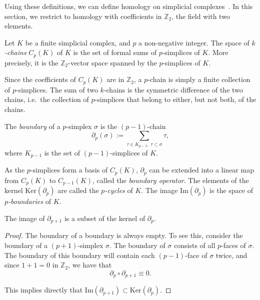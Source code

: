 \documentclass[a4paper,11pt,openany,extrafontsizes]{memoir}
\begin{document}
Using these definitions, we can define homology on simplicial
complexes~\cite{edelsbrunner_computational_2010,
  chazal_introduction_2017}. In this section, we restrict to homology
with coefficients in $\mathbb{Z}_2$, the field with two elements.

\begin{defn}[$k$-chains]
  Let $K$ be a finite simplicial complex, and $p$ a non-negative
  integer. The space of \emph{$k$-chains} $C_p(K)$ of $K$ is the set
  of formal sums of $p$-simplices of $K$. More precisely, it is the
  $\mathbb{Z}_2$-vector space spanned by the $p$-simplices of $K$.
\end{defn}

Since the coefficients of $C_p(K)$ are in $\mathbb{Z}_2$, a $p$-chain
is simply a finite collection of $p$-simplices. The sum of two
$k$-chains is the symmetric difference of the two chains, i.e.\ the
collection of $p$-simplices that belong to either, but not both, of
the chains.

\begin{defn}[Boundary]
  The \emph{boundary} of a $p$-simplex $\sigma$ is the $(p-1)$-chain
  \[ \partial_p(\sigma) := \sum_{\tau\in K_{p-1},\; \tau\subset\sigma}
    \tau, \] where $K_{p-1}$ is the set of $(p-1)$-simplices of $K$.
\end{defn}

As the $p$-simplices form a basis of $C_p(K)$, $\partial_p$ can be
extended into a linear map from $C_p(K)$ to $C_{p-1}(K)$, called the
\emph{boundary operator}. The elements of the kernel
$\mathrm{Ker}(\partial_p)$ are called the \emph{$p$-cycles} of
$K$. The image $\mathrm{Im}(\partial_p)$ is the space of
\emph{$p$-boundaries} of $K$.

\begin{lem}\label{lem:boundary}
  The image of $\partial_{p+1}$ is a subset of the kernel of
  $\partial_p$.
\end{lem}

\begin{proof}
  The boundary of a boundary is always empty. To see this, consider
  the boundary of a $(p+1)$-simplex $\sigma$. The boundary of $\sigma$
  consists of all $p$-faces of $\sigma$. The boundary of this boundary
  will contain each $(p-1)$-face of $\sigma$ twice, and since $1+1=0$
  in $\mathbb{Z}_2$, we have that
  \[ \partial_{p} \circ \partial_{p+1} \equiv 0. \]

  This implies directly that
  $\mathrm{Im}(\partial_{p+1}) \subset \mathrm{Ker}(\partial_p)$.
\end{proof}
\end{document}
